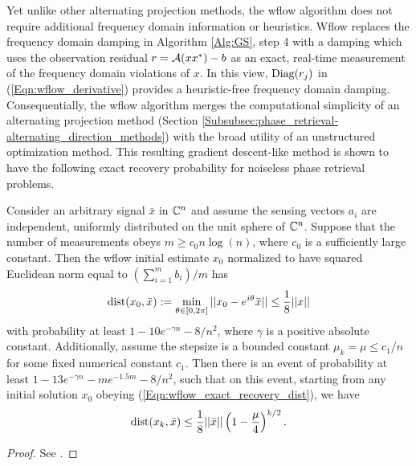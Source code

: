\begin{enumerate}
Yet unlike other alternating projection methods, the wflow algorithm does not require additional frequency domain information or heuristics.  Wflow replaces the frequency domain damping in Algorithm \ref{Alg:GS}, step 4 with a damping which uses the observation residual $r = {\mathcal A}(xx^*) - b$ as an exact, real-time measurement of the frequency domain violations of $x$.  In this view, $\textnormal{Diag}(r_j)$ in (\ref{Eqn:wflow_derivative}) provides a heuristic-free frequency domain damping.  Consequentially, the wflow algorithm merges the computational simplicity of an alternating projection method (Section  \ref{Subsubsec:phase_retrieval-alternating_direction_methods}) with the broad utility of an unstructured optimization method.  This resulting gradient descent-like method is shown to have the following exact recovery probability for noiseless phase retrieval problems.

\begin{theorem} 			\label{Thm:wflow_exact_recovery}
Consider an arbitrary signal $\bar{x}$ in ${\mathbb C}^n$ and assume the sensing vectors $a_i$ are independent, uniformly distributed on the unit sphere of ${\mathbb C}^n$.  Suppose that the number of measurements obeys $m \geq c_0 n \log(n)$, where $c_0$ is a sufficiently large constant.  Then the wflow initial estimate $x_0$ normalized to have squared Euclidean norm equal to $(\sum_{i=1}^m b_i)/m$ has
\begin{equation} 			\label{Eqn:wflow_exact_recovery_dist}
\operatorname{dist}(x_0, \bar{x}) := \min\limits_{\theta \in [0, 2\pi]} ||x_0 - e^{i \theta}\bar{x} || \leq \frac{1}{8}||x||
\end{equation}
with probability at least $1 - 10e^{-\gamma n} - 8/n^2$, where $\gamma$ is a positive absolute constant.  Additionally, assume the stepsize is a bounded constant $\mu_k = \mu \leq c_1/n$ for some fixed numerical constant $c_1$.  Then there is an event of probability at least $1 - 13e^{- \gamma n} - me^{-1.5m} - 8/n^2$, such that on this event, starting from any initial solution $x_0$ obeying (\ref{Eqn:wflow_exact_recovery_dist}), we have
\begin{equation} 			\label{Eqn:wflow_exact_recovery_rate}
\operatorname{dist}(x_k, \bar{x}) \leq \frac{1}{8} ||\bar{x}|| \left( 1 - \frac{\mu}{4} \right)^{k / 2}.
\end{equation}
\end{theorem}
\begin{proof}
See \cite[Section 7]{DBLP:journals/tit/CandesLS15}.
\end{proof}


\end{enumerate}
